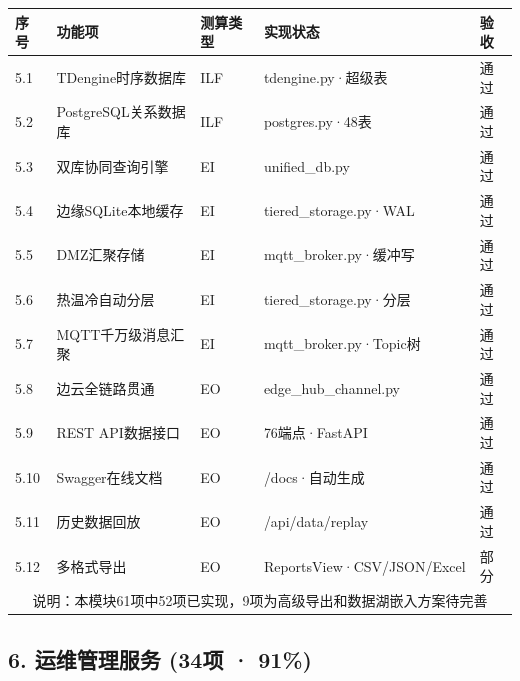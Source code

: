 \documentclass[11pt,a4paper]{ctexart}
\begin{document}
\begin{longtable}{p{1cm}p{4cm}p{3cm}p{3cm}p{2.5cm}}
\toprule
\textbf{序号} & \textbf{功能项} & \textbf{测算类型} & \textbf{实现状态} & \textbf{验收} \\
\midrule
5.1 & TDengine时序数据库 & ILF & tdengine.py·超级表 & \color{ok}通过 \\
5.2 & PostgreSQL关系数据库 & ILF & postgres.py·48表 & \color{ok}通过 \\
5.3 & 双库协同查询引擎 & EI & unified\_db.py & \color{ok}通过 \\
5.4 & 边缘SQLite本地缓存 & EI & tiered\_storage.py·WAL & \color{ok}通过 \\
5.5 & DMZ汇聚存储 & EI & mqtt\_broker.py·缓冲写 & \color{ok}通过 \\
5.6 & 热温冷自动分层 & EI & tiered\_storage.py·分层 & \color{ok}通过 \\
5.7 & MQTT千万级消息汇聚 & EI & mqtt\_broker.py·Topic树 & \color{ok}通过 \\
5.8 & 边云全链路贯通 & EO & edge\_hub\_channel.py & \color{ok}通过 \\
5.9 & REST API数据接口 & EO & 76端点·FastAPI & \color{ok}通过 \\
5.10 & Swagger在线文档 & EO & /docs·自动生成 & \color{ok}通过 \\
5.11 & 历史数据回放 & EO & /api/data/replay & \color{ok}通过 \\
5.12 & 多格式导出 & EO & ReportsView·CSV/JSON/Excel & \color{warn}部分 \\
\midrule
\multicolumn{5}{c}{说明：本模块61项中52项已实现，9项为高级导出和数据湖嵌入方案待完善} \\
\bottomrule
\end{longtable}

\subsection{6. 运维管理服务 (34项 · 91\%)}
\end{document}
